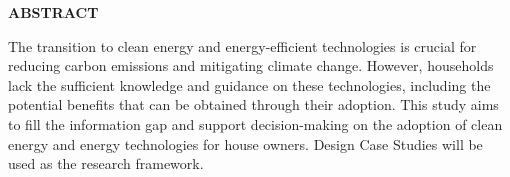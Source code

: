  \setcounter{page}{2}
\begin{center}
{\Large{\bf{ABSTRACT}}}
\end{center}

\noindent

The transition to clean energy and energy-efficient technologies is crucial for reducing carbon emissions and mitigating climate change. 
However, households lack the sufficient knowledge and guidance on these technologies, including the potential benefits that can be obtained through their adoption.
This study aims to fill the information gap and support decision-making on the adoption of clean energy and energy technologies for house owners. 
Design Case Studies will be used as the research framework. 
\clearpage